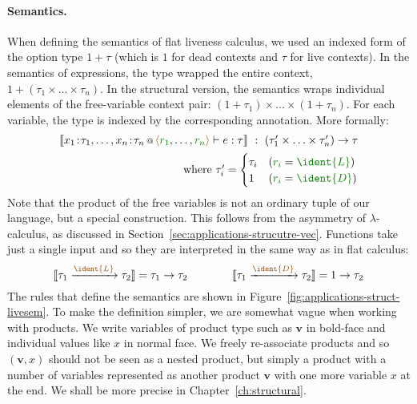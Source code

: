 \paragraph{Semantics.}
When defining the semantics of flat liveness calculus, we used an indexed form of the option type
$1 + \tau$ (which is $1$ for dead contexts and $\tau$ for live contexts). In the semantics of 
expressions, the type wrapped the entire context, \ie~$1+(\tau_1 \times \ldots \times \tau_n)$.
In the structural version, the semantics wraps individual elements of the free-variable context
pair: $(1+\tau_1) \times \ldots \times (1+ \tau_n)$. For each variable, the type is indexed by 
the corresponding annotation. More formally:
%
\begin{equation*}
\begin{array}{r}
\sem{\coctx{x_1\!:\!\tau_1, \ldots, x_n\!:\!\tau_n}{ \alift{\cclrd{r_1}, \ldots, \cclrd{r_n}} } \vdash e : \tau} 
  ~:~ (\tau'_1 \times \ldots \times \tau'_n) \rightarrow \tau\\[0.5em]
\textnormal{where}~\tau'_i = \begin{cases}
\tau_i & (\cclrd{r_i} = \cclrd{\ident{L}})\\
1      & (\cclrd{r_i} = \cclrd{\ident{D}})
\end{cases}
\end{array}
\end{equation*}
%
Note that the product of the free variables is not an ordinary tuple of our language, but a special
construction. This follows from the asymmetry of $\lambda$-calculus, as discussed in 
Section~\ref{sec:applications-strucutre-vec}. Functions take just a single input and so they are
interpreted in the same way as in flat calculus:
%
\begin{equation*}
\sem{\tau_1 \xrightarrow{\aclrd{\ident{L}}} \tau_2} = \tau_1 \rightarrow \tau_2 \qquad\qquad
\sem{\tau_1 \xrightarrow{\aclrd{\ident{D}}} \tau_2} = 1 \rightarrow \tau_2
\end{equation*}
%
The rules that define the semantics are shown in Figure~\ref{fig:applications-struct-livesem}.
To make the definition simpler, we are somewhat vague when working with products. We write 
variables of product type such as $\mathbf{v}$ in bold-face and individual values like $x$ in 
normal face. We freely re-associate products and so $(\mathbf{v}, x)$ should not be seen as a
nested product, but simply a product with a number of variables represented as another product
$\mathbf{v}$ with one more variable $x$ at the end. We shall be more precise in Chapter~\ref{ch:structural}.

